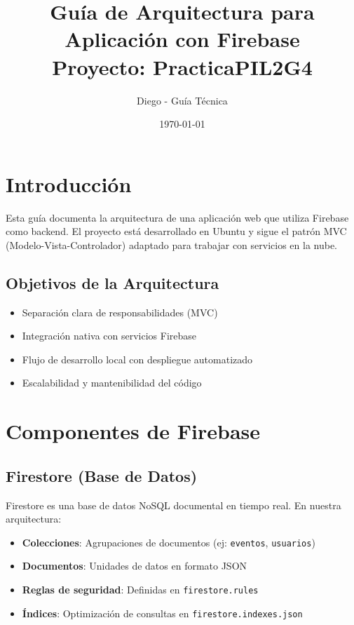 \documentclass[12pt,a4paper]{article}
\title{\textbf{Guía de Arquitectura para Aplicación con Firebase}\\
\large Proyecto: PracticaPIL2G4}
\author{Diego - Guía Técnica}
\date{\today}
\begin{document}
\maketitle
\tableofcontents
\newpage

\section{Introducción}

Esta guía documenta la arquitectura de una aplicación web que utiliza Firebase como backend. El proyecto está desarrollado en Ubuntu y sigue el patrón MVC (Modelo-Vista-Controlador) adaptado para trabajar con servicios en la nube.

\subsection{Objetivos de la Arquitectura}
\begin{itemize}
    \item Separación clara de responsabilidades (MVC)
    \item Integración nativa con servicios Firebase
    \item Flujo de desarrollo local con despliegue automatizado
    \item Escalabilidad y mantenibilidad del código
\end{itemize}

\section{Componentes de Firebase}

\subsection{Firestore (Base de Datos)}
Firestore es una base de datos NoSQL documental en tiempo real. En nuestra arquitectura:
\begin{itemize}
    \item \textbf{Colecciones}: Agrupaciones de documentos (ej: \texttt{eventos}, \texttt{usuarios})
    \item \textbf{Documentos}: Unidades de datos en formato JSON
    \item \textbf{Reglas de seguridad}: Definidas en \texttt{firestore.rules}
    \item \textbf{Índices}: Optimización de consultas en \texttt{firestore.indexes.json}
\end{itemize}
\end{document}
